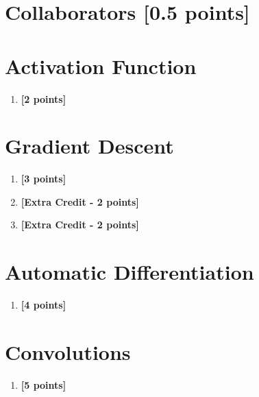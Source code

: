 \documentclass[11pt,english]{article}
\begin{document}

\section{Collaborators [0.5 points]}



\section{Activation Function}
\begin{enumerate}[start]

\item
\textbf{[2 points]}


\end{enumerate}

\section{Gradient Descent}
\begin{enumerate}[start]

\item
\textbf{[3 points]}


\item
\textbf{[Extra Credit - 2 points]}


\item
\textbf{[Extra Credit - 2 points]}


\end{enumerate}


\section{Automatic Differentiation}
\begin{enumerate}[resume]

\item
\textbf{[4 points]}


\end{enumerate}

\section{Convolutions}
\begin{enumerate}[resume]

\item 
\textbf{[5 points]}


\end{enumerate}
\end{document}
